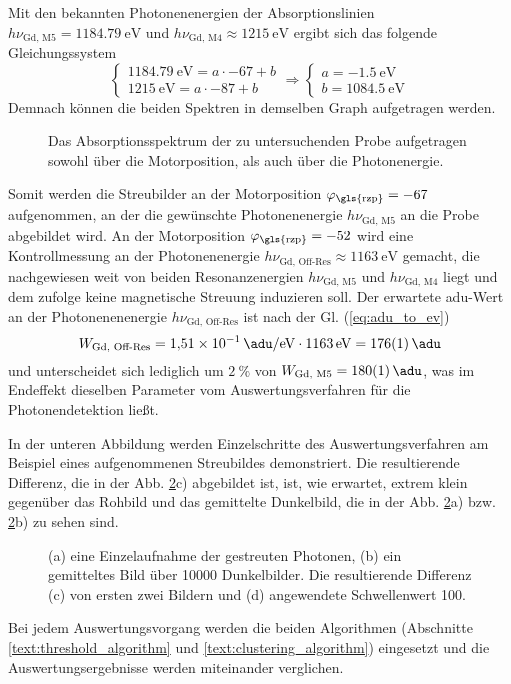 \noindent
Mit den bekannten Photonenenergien der Absorptionslinien $h\nu_\text{Gd, M5} = \SI{1184,79}{\eV}$ und $h\nu_\text{Gd, M4} \approx \SI{1215}{\eV}$ ergibt sich das folgende Gleichungssystem
\begin{equation}
    \begin{cases}
    \SI{1184,79}{\eV} = a\cdot \num{-67} + b\\
    \SI{1215}{\eV} = a\cdot \num{-87} + b
    \end{cases}
    \Rightarrow
    \begin{cases}
    a = \SI{-1,5}{\eV}\\
    b = \SI{1084,5}{\eV}
    \end{cases}
    \label{eq:rzp_phi_to_ev}
\end{equation}
\noindent
Demnach können die beiden Spektren in demselben Graph aufgetragen werden.
\begin{figure}[H]
    \centering
    
    \caption{Das Absorptionsspektrum der zu untersuchenden Probe aufgetragen sowohl über die Motorposition, als auch über die Photonenergie.}
    \label{fig:rzp_phi_ev}
\end{figure}
\noindent
Somit werden die Streubilder an der Motorposition $\varphi_\text{\gls{rzp}} = \num{-67}$ aufgenommen, an der die gewünschte Photonenenergie $h\nu_\text{Gd, M5}$ an die Probe abgebildet wird. An der Motorposition $\varphi_\text{\gls{rzp}} = \num{-52}$ wird eine Kontrollmessung an der Photonenenergie $h\nu_\text{Gd, Off-Res} \approx \SI{1163}{\eV}$ gemacht, die nachgewiesen weit von beiden Resonanzenergien $h\nu_\text{Gd, M5}$ und $h\nu_\text{Gd, M4}$ liegt und dem zufolge keine magnetische Streuung induzieren soll. Der erwartete \gls{adu}-Wert an der Photonenenenergie $h\nu_\text{Gd, Off-Res}$ ist nach der Gl. (\ref{eq:adu_to_ev})
\begin{equation}
    W_\text{Gd, Off-Res} = \SI{1,51e-1}{\adu\per\eV} \cdot \SI{1163}{\eV} = \SI{176(1)}{\adu}
\end{equation}
und unterscheidet sich lediglich um $\SI{2}{\percent}$ von $W_\text{Gd, M5} = \SI{180(1)}{\adu}$, was im Endeffekt dieselben Parameter vom Auswertungsverfahren für die Photonendetektion ließt.

\noindent
In der unteren Abbildung werden Einzelschritte des Auswertungsverfahren am Beispiel eines aufgenommenen Streubildes demonstriert. 
Die resultierende Differenz, die in der Abb. \ref{fig:capture_ped_diff}c) abgebildet ist, ist, wie erwartet, extrem klein gegenüber das Rohbild und das gemittelte Dunkelbild, die in der Abb. \ref{fig:capture_ped_diff}a) bzw. \ref{fig:capture_ped_diff}b) zu sehen sind. 
\begin{figure}[H]
    \centering
    
    \caption{(a) eine Einzelaufnahme der gestreuten Photonen, (b) ein gemitteltes Bild über \num{10000} Dunkelbilder.  Die resultierende Differenz (c) von ersten zwei Bildern und (d) angewendete Schwellenwert \SI{100}{\adu}.}
    \label{fig:capture_ped_diff}
\end{figure}
\noindent
Bei jedem Auswertungsvorgang werden die beiden Algorithmen (Abschnitte \ref{text:threshold_algorithm} und \ref{text:clustering_algorithm}) eingesetzt und die Auswertungsergebnisse werden miteinander verglichen. 
